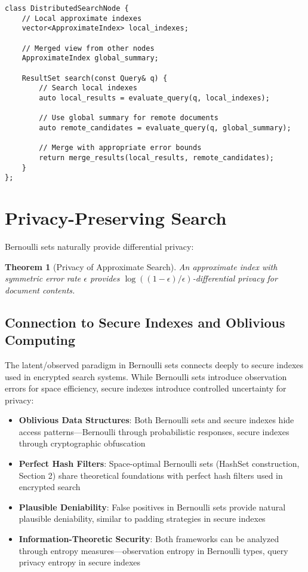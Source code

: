 \documentclass[11pt,final,hidelinks]{article}
\newtheorem{theorem}{Theorem}[section]
\begin{document}
\begin{verbatim}
class DistributedSearchNode {
    // Local approximate indexes
    vector<ApproximateIndex> local_indexes;
    
    // Merged view from other nodes
    ApproximateIndex global_summary;
    
    ResultSet search(const Query& q) {
        // Search local indexes
        auto local_results = evaluate_query(q, local_indexes);
        
        // Use global summary for remote documents
        auto remote_candidates = evaluate_query(q, global_summary);
        
        // Merge with appropriate error bounds
        return merge_results(local_results, remote_candidates);
    }
};
\end{verbatim}

\section{Privacy-Preserving Search}

Bernoulli sets naturally provide differential privacy:

\begin{theorem}[Privacy of Approximate Search]
An approximate index with symmetric error rate $\epsilon$ provides $\log((1-\epsilon)/\epsilon)$-differential privacy for document contents.
\end{theorem}

\subsection{Connection to Secure Indexes and Oblivious Computing}

The latent/observed paradigm in Bernoulli sets connects deeply to secure indexes used in encrypted search systems. While Bernoulli sets introduce observation errors for space efficiency, secure indexes introduce controlled uncertainty for privacy:

\begin{itemize}
    \item \textbf{Oblivious Data Structures}: Both Bernoulli sets and secure indexes hide access patterns—Bernoulli through probabilistic responses, secure indexes through cryptographic obfuscation
    \item \textbf{Perfect Hash Filters}: Space-optimal Bernoulli sets (HashSet construction, Section 2) share theoretical foundations with perfect hash filters used in encrypted search
    \item \textbf{Plausible Deniability}: False positives in Bernoulli sets provide natural plausible deniability, similar to padding strategies in secure indexes
    \item \textbf{Information-Theoretic Security}: Both frameworks can be analyzed through entropy measures—observation entropy in Bernoulli types, query privacy entropy in secure indexes
\end{itemize}
\end{document}
